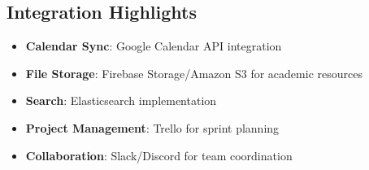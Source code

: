 \subsection{Integration Highlights}
\begin{itemize}
    \item \textbf{Calendar Sync}: Google Calendar API integration
    \item \textbf{File Storage}: Firebase Storage/Amazon S3 for academic resources
    \item \textbf{Search}: Elasticsearch implementation
    \item \textbf{Project Management}: Trello for sprint planning
    \item \textbf{Collaboration}: Slack/Discord for team coordination
\end{itemize}